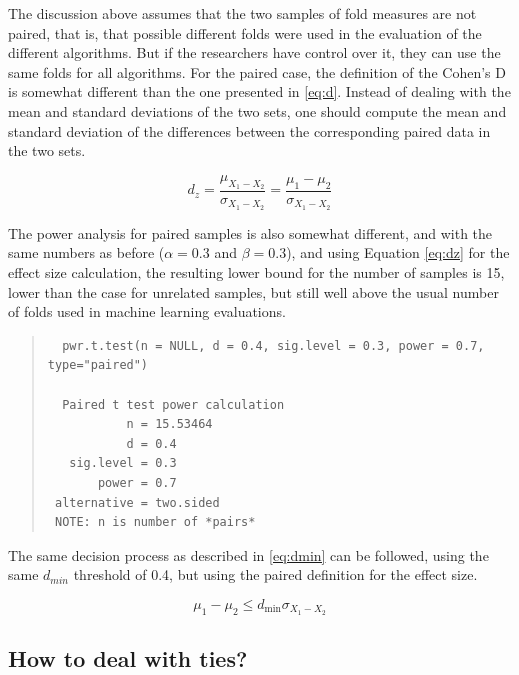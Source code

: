 \documentclass[twoside,11pt,preprint]{article}
\begin{document}
The discussion above assumes that the two samples of fold measures are
not paired, that is, that possible different
folds were used in the evaluation of the different algorithms. But if
the researchers have control over it, they can use the same folds for
all algorithms. For the paired case, the definition of
the Cohen's D is somewhat different than the one presented in
\ref{eq:d}. Instead of dealing with the mean and standard deviations
of the two sets, one should compute the mean and standard deviation of
the differences between the corresponding paired data in the two sets.

\begin{equation} \label{eq:dz}
d_z = \frac{\mu_{X_1 - X_2}}{\sigma_{X_1 - X_2}} = \frac{\mu_1 - \mu_2}{\sigma_{X_1 - X_2}} 
\end{equation}

The power analysis for paired samples is also somewhat different, and
with the same numbers as before (\(\alpha = 0.3\) and \(\beta = 0.3\)),
and using Equation \ref{eq:dz} for the effect size calculation, the
resulting lower bound for the number of samples is 15, lower than the
case for unrelated samples, but still well above the usual number of
folds used in machine learning evaluations.

\begin{quote}
\begin{verbatim}
  pwr.t.test(n = NULL, d = 0.4, sig.level = 0.3, power = 0.7, type="paired")

  Paired t test power calculation 
           n = 15.53464
           d = 0.4
   sig.level = 0.3
       power = 0.7
 alternative = two.sided
 NOTE: n is number of *pairs*
\end{verbatim}
\end{quote}

The same decision process as described in \ref{eq:dmin} can be
followed, using the same \(d_{min}\) threshold of 0.4, but using the
paired definition for the effect size.

\begin{equation} \label{eq:dmin2}
\mu_1 - \mu_2 \le d_{\min} \sigma_{X_1 - X_2}
\end{equation}

\hypertarget{how-to-deal-with-ties}{%
\subsection{\texorpdfstring{How to deal with ties? \label{test-ties}}{How to deal with ties? }}\label{how-to-deal-with-ties}}
\end{document}
